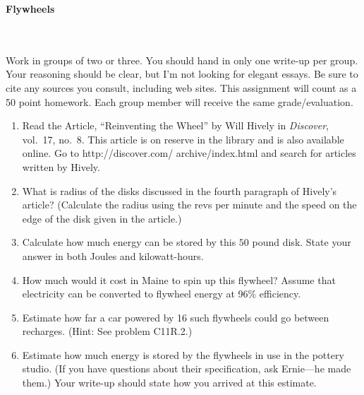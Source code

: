  
\oddsidemargin=0in
\textwidth=6.5in
\topmargin=0in
\textheight=9.9in

\renewcommand{\arraystretch}{1.3}


\pagestyle{empty}

\begin{center}
{\Large {\bf Flywheels}} \\
\hspace{3cm}\\
\end{center}
\hspace{1cm}\\

Work in groups of two or three.  You should hand in only one write-up
per group.   Your reasoning should be clear, but I'm not looking for
elegant essays.  Be sure to cite any sources you consult, including web
sites.  This assignment will count as a 50 point homework.  Each
group member will receive the same grade/evaluation. 


\begin{enumerate}

\item Read the Article, ``Reinventing the Wheel'' by Will Hively in
{\em Discover}, vol.~17, no.~8.  This article is on reserve in the
library and is also available online.  Go to
http://discover.com/
archive/index.html and search for articles written
by Hively.  

\item What is radius of the disks discussed in the fourth paragraph of
Hively's article?  (Calculate the radius using the revs per minute and
the speed on the edge of the disk given in the article.)


\item Calculate how much energy can be stored by this $50$ pound
disk.  State your answer in both Joules and kilowatt-hours.  

\item How much would it cost in Maine to spin up this flywheel?
Assume that electricity can be converted to flywheel energy at 96\%
efficiency.  

\item Estimate how far a car powered by 16 such flywheels could go
between recharges.  (Hint:  See problem C11R.2.)



\item Estimate how much energy is stored by the flywheels in use in
the pottery studio.  (If you have questions about their specification,
ask Ernie---he made them.)  Your write-up should state how you arrived
at this estimate.  


\end{enumerate}



